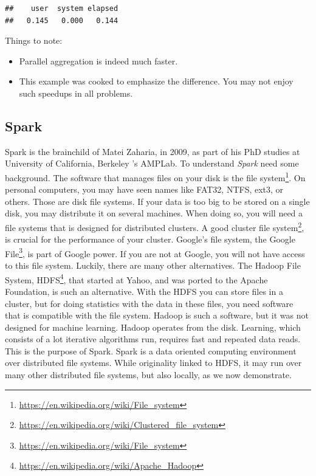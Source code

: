 \documentclass[]{book}
\providecommand{\tightlist}{%
  \setlength{\itemsep}{0pt}\setlength{\parskip}{0pt}}
\renewcommand{\href}[2]{#2\footnote{\url{#1}}}
\theoremstyle{definition}
\theoremstyle{definition}
\theoremstyle{definition}
\theoremstyle{remark}
\begin{document}
\begin{verbatim}
##    user  system elapsed 
##   0.145   0.000   0.144
\end{verbatim}

Things to note:

\begin{itemize}
\tightlist
\item
  Parallel aggregation is indeed much faster.
\item
  This example was cooked to emphasize the difference. You may not enjoy such speedups in all problems.
\end{itemize}

\hypertarget{spark}{%
\subsection{Spark}\label{spark}}

Spark is the brainchild of Matei Zaharia, in 2009, as part of his PhD studies at University of California, Berkeley 's AMPLab.
To understand \emph{Spark} need some background.
The software that manages files on your disk is the \href{https://en.wikipedia.org/wiki/File_system}{file system}.
On personal computers, you may have seen names like FAT32, NTFS, ext3, or others.
Those are disk file systems.
If your data is too big to be stored on a single disk, you may distribute it on several machines.
When doing so, you will need a file systems that is designed for distributed clusters.
A good \href{https://en.wikipedia.org/wiki/Clustered_file_system}{cluster file system}, is crucial for the performance of your cluster.
Google's file system, the \href{https://en.wikipedia.org/wiki/File_system}{Google File}, is part of Google power.
If you are not at Google, you will not have access to this file system.
Luckily, there are many other alternatives.
The Hadoop File System, \href{https://en.wikipedia.org/wiki/Apache_Hadoop}{HDFS}, that started at Yahoo, and was ported to the Apache Foundation, is such an alternative.
With the HDFS you can store files in a cluster, but for doing statistics with the data in these files, you need software that is compatible with the file system.
Hadoop is such a software, but it was not designed for machine learning.
Hadoop operates from the disk.
Learning, which consists of a lot iterative algorithms run, requires fast and repeated data reads.
This is the purpose of Spark.
Spark is a data oriented computing environment over distributed file systems.
While originality linked to HDFS, it may run over many other distributed file systems, but also locally, as we now demonstrate.
\end{document}

